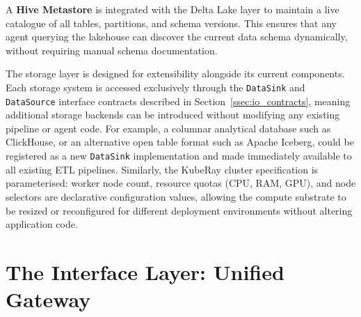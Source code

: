 \documentclass[12pt, a4paper]{report}
\begin{document}
A \textbf{Hive Metastore} is integrated with the Delta Lake layer to maintain a live
catalogue of all tables, partitions, and schema versions. This ensures that any agent
querying the lakehouse can discover the current data schema dynamically, without
requiring manual schema documentation.

The storage layer is designed for extensibility alongside its current components.
Each storage system is accessed exclusively through the \texttt{DataSink} and
\texttt{DataSource} interface contracts described in Section~\ref{ssec:io_contracts},
meaning additional storage backends can be introduced without modifying any existing
pipeline or agent code.
For example, a columnar analytical database such as ClickHouse, or an alternative
open table format such as Apache Iceberg, could be registered as a new \texttt{DataSink}
implementation and made immediately available to all existing ETL pipelines.
Similarly, the KubeRay cluster specification is parameterised: worker node count,
resource quotas (CPU, RAM, GPU), and node selectors are declarative configuration
values, allowing the compute substrate to be resized or reconfigured for different
deployment environments without altering application code.

\section{The Interface Layer: Unified Gateway}
\label{sec:interface_layer}
\end{document}
